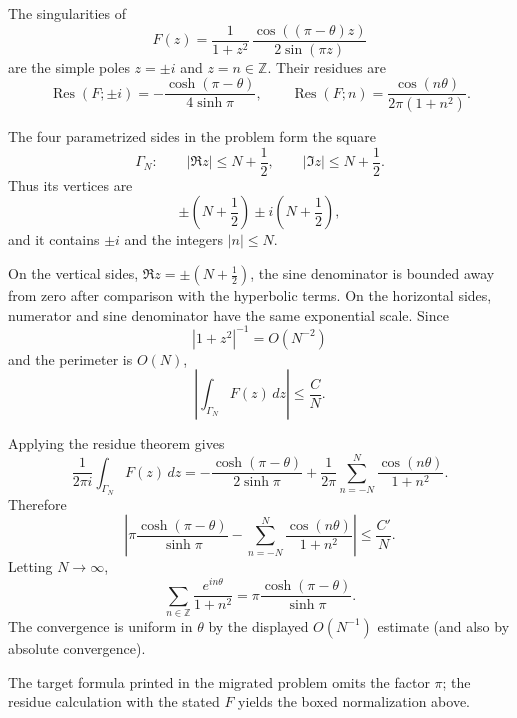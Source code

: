 \begin{solution}
The singularities of
\[
F(z)=\frac{1}{1+z^2}\,
\frac{\cos((\pi-\theta)z)}{2\sin(\pi z)}
\]
are the simple poles \(z=\pm i\) and \(z=n\in\mathbb Z\). Their residues are
\[
\operatorname{Res}(F;\pm i)
=
-\frac{\cosh(\pi-\theta)}{4\sinh\pi},
\qquad
\operatorname{Res}(F;n)
=
\frac{\cos(n\theta)}{2\pi(1+n^2)}.
\]

The four parametrized sides in the problem form the square
\[
\Gamma_N:
\qquad
|\Re z|\le N+\frac12,\qquad
|\Im z|\le N+\frac12.
\]
Thus its vertices are
\[
\pm\left(N+\frac12\right)
\pm i\left(N+\frac12\right),
\]
and it contains \(\pm i\) and the integers \(|n|\le N\).

On the vertical sides, \(\Re z=\pm(N+\tfrac12)\), the sine denominator is bounded away from zero after comparison with the hyperbolic terms. On the horizontal sides, numerator and sine denominator have the same exponential scale. Since
\[
|1+z^2|^{-1}=O(N^{-2})
\]
and the perimeter is \(O(N)\),
\[
\left|\int_{\Gamma_N}F(z)\,dz\right|
\le\frac{C}{N}.
\]

Applying the residue theorem gives
\[
\frac{1}{2\pi i}\int_{\Gamma_N}F(z)\,dz
=
-\frac{\cosh(\pi-\theta)}{2\sinh\pi}
+
\frac{1}{2\pi}
\sum_{n=-N}^{N}\frac{\cos(n\theta)}{1+n^2}.
\]
Therefore
\[
\left|
\pi\frac{\cosh(\pi-\theta)}{\sinh\pi}
-
\sum_{n=-N}^{N}\frac{\cos(n\theta)}{1+n^2}
\right|
\le\frac{C'}{N}.
\]
Letting \(N\to\infty\),
\[
\boxed{
\sum_{n\in\mathbb Z}\frac{e^{in\theta}}{1+n^2}
=
\pi\frac{\cosh(\pi-\theta)}{\sinh\pi}.
}
\]
The convergence is uniform in \(\theta\) by the displayed \(O(N^{-1})\) estimate (and also by absolute convergence).

The target formula printed in the migrated problem omits the factor \(\pi\); the residue calculation with the stated \(F\) yields the boxed normalization above.
\end{solution}


